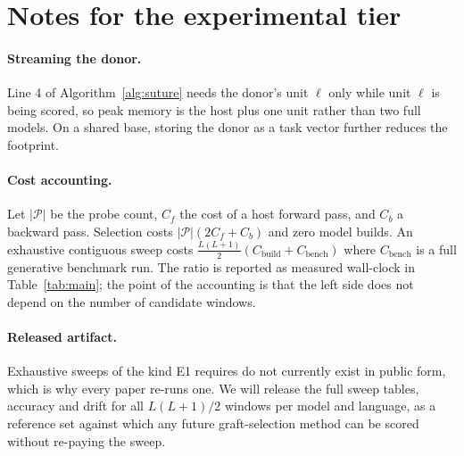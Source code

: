 \documentclass[10pt]{article}
\theoremstyle{plain}
\theoremstyle{definition}
\theoremstyle{remark}
\begin{document}
\section{Notes for the experimental tier}
\label{app:notes}

\paragraph{Streaming the donor.}
Line 4 of Algorithm~\ref{alg:suture} needs the donor's unit $\ell$ only while
unit $\ell$ is being scored, so peak memory is the host plus one unit rather
than two full models. On a shared base, storing the donor as a task vector
further reduces the footprint.

\paragraph{Cost accounting.}
Let $|\mathcal{P}|$ be the probe count, $C_f$ the cost of a host forward pass,
and $C_b$ a backward pass. Selection costs $|\mathcal{P}|(2C_f + C_b)$ and zero
model builds. An exhaustive contiguous sweep costs
$\tfrac{L(L+1)}{2}\left(C_{\mathrm{build}} + C_{\mathrm{bench}}\right)$ where
$C_{\mathrm{bench}}$ is a full generative benchmark run. The ratio is reported
as measured wall-clock in Table~\ref{tab:main}; the point of the accounting is
that the left side does not depend on the number of candidate windows.

\paragraph{Released artifact.}
Exhaustive sweeps of the kind E1 requires do not currently exist in public form,
which is why every paper re-runs one. We will release the full sweep tables,
accuracy and drift for all $L(L+1)/2$ windows per model and language, as a
reference set against which any future graft-selection method can be scored
without re-paying the sweep.
\end{document}
